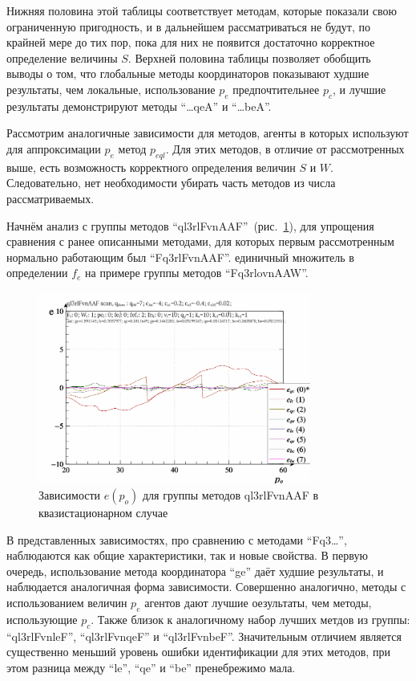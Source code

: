 Нижняя половина этой таблицы соответствует методам,
которые показали свою ограниченную пригодность, и в дальнейшем
рассматриваться не будут, по крайней мере до тих пор,
пока для них не появится достаточно корректное определение величины $S$.
Верхней половина таблицы позволяет обобщить выводы о том, что
глобальные методы координаторов показывают худшие результаты, чем локальные,
использование $p_e$ предпочтительнее $p_c$,
и лучшие результаты демонстрируют методы ``\ldots qeA''  и ``\ldots beA''.

Рассмотрим аналогичные зависимости для методов, агенты в которых
используют для аппроксимации $p_e$ метод $p_{eql}$.
Для этих методов, в отличие от рассмотренных выше,
есть возможность корректного определения величин $S$ и $W$.
Следовательно, нет необходимости убирать часть методов из числа рассматриваемых.

Начнём анализ с группы методов ``ql3rlFvnAAF''~(рис.~\ref{atu:f:ql3rlFvnAAF_scan}), для упрощения сравнения
с ранее описанными методами, для которых первым рассмотренным нормально работающим был ``Fq3rlFvnAAF''.
единичный множитель в определении $f_e$ на примере группы методов ``Fq3rlovnAAW''.

\begin{figure}[htb!]
  \centerline{
    \includegraphics[width=0.8\textwidth]{p/scan/qls-p_p_e_ql3rlFvnAAF_scan.png}
  }
  \caption{Зависимости $e(p_o)$ для группы методов ql3rlFvnAAF в квазистационарном случае}
  \label{atu:f:ql3rlFvnAAF_scan}
\end{figure}

В представленных зависимостях, про сравнению с методами ``Fq3\ldots'', наблюдаются
как общие характеристики, так и новые свойства. В первую очередь,
использование метода координатора ``ge'' даёт худшие результаты,
и наблюдается аналогичная форма зависимости.
Совершенно аналогично, методы с использованием величин $p_e$ агентов
дают лучшие оезультаты, чем методы,  использующие $p_c$.
Также близок к аналогичному набор лучших метдов из группы:
``ql3rlFvnleF'', ``ql3rlFvnqeF'' и ``ql3rlFvnbeF''.
Значительным отличием является существенно меньший уровень ошибки
идентификации для этих методов, при этом разница между
``le'', ``qe'' и ``be'' пренебрежимо мала.


